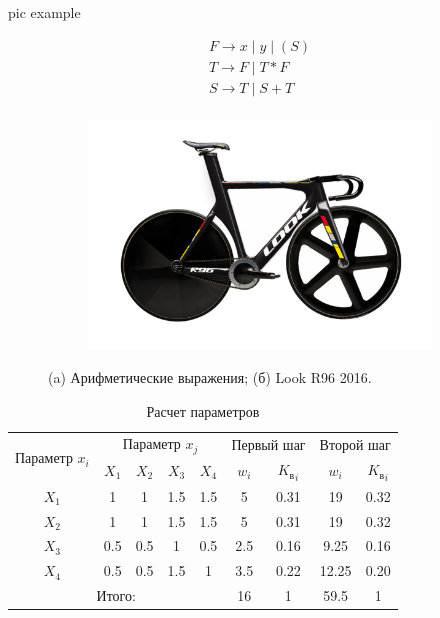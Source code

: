\documentclass[oneside,a4paper,14pt,final]{extreport}
\begin{document}
pic example
\begin{figure}[ht]
\centering
    \begin{subfigure}[b]{0.3\textwidth}
    \centering
        $$\begin{array}{l}
        F \to x \;|\; y \;|\; (S) \\
        T \to F \;|\; T \ast F \\
        S \to T \;|\; S + T \\
        \end{array}$$
        \caption{}
    \end{subfigure} %
    \begin{subfigure}[b]{0.6\textwidth}
    \centering
        \includegraphics[scale=0.5]{look-track.png}
        \caption{}
    \end{subfigure}

    \caption{(a) Арифметические выражения;
             (б) Look R96 2016.}
    \label{fig_parsetree}
\end{figure}


\begin{table}[ht]
\caption{Расчет параметров}
\label{tab_weight}
\centering
    \begin{tabular}{|c|c|c|c|c|c|c|c|c|}
    \hline \multirow{2}{*}{Параметр $x_i$} & \multicolumn{4}{c|}{Параметр $x_j$} &
        \multicolumn{2}{c|}{Первый шаг} & \multicolumn{2}{c|}{Второй шаг} \\
    \cline{2-9} & $X_1$ & $X_2$ & $X_3$ & $X_4$ & $w_i$ &
        ${K_\text{в}}_i$ & $w_i$ & ${K_\text{в}}_i$ \\
    \hline $X_1$ & 1 & 1 & 1.5 & 1.5 & 5 & 0.31 & 19 & 0.32 \\
    \hline $X_2$ & 1 & 1 & 1.5 & 1.5 & 5 & 0.31 & 19 & 0.32 \\
    \hline $X_3$ & 0.5 & 0.5 & 1 & 0.5 & 2.5 & 0.16 & 9.25 & 0.16 \\
    \hline $X_4$ & 0.5 & 0.5 & 1.5 & 1 & 3.5 & 0.22 & 12.25 & 0.20 \\
    \hline \multicolumn{5}{|c|}{Итого:} & 16 & 1 & 59.5 & 1 \\
    \hline
    \end{tabular}
\end{table}
\end{document}

